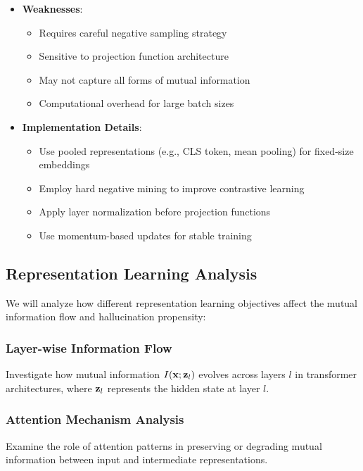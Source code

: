 \begin{itemize}
    \item \textbf{Weaknesses}:
    \begin{itemize}
        \item Requires careful negative sampling strategy
        \item Sensitive to projection function architecture
        \item May not capture all forms of mutual information
        \item Computational overhead for large batch sizes
    \end{itemize}

    \item \textbf{Implementation Details}:
    \begin{itemize}
        \item Use pooled representations (e.g., CLS token, mean pooling) for fixed-size embeddings
        \item Employ hard negative mining to improve contrastive learning
        \item Apply layer normalization before projection functions
        \item Use momentum-based updates for stable training
    \end{itemize}
\end{itemize}

\subsection{Representation Learning Analysis}
\label{subsec:repr_analysis}

We will analyze how different representation learning objectives affect the mutual information flow and hallucination propensity:

\subsubsection{Layer-wise Information Flow}
Investigate how mutual information $I({\mathbf{x}}; {\mathbf{z}}_l)$ evolves across layers $l$ in transformer architectures, where ${\mathbf{z}}_l$ represents the hidden state at layer $l$.

\subsubsection{Attention Mechanism Analysis}
Examine the role of attention patterns in preserving or degrading mutual information between input and intermediate representations.

